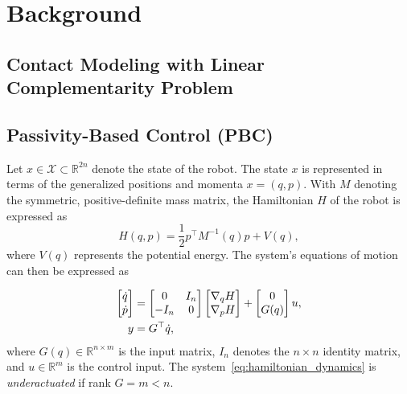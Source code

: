 \chapter{Background}
\label{ch:background}

\section{Contact Modeling with Linear Complementarity Problem}

\section{Passivity-Based Control (PBC)}

Let $x \in \mathcal{X} \subset \mathbb{R}^{2n}$ denote the state of the robot.
%
The state $x$ is represented in terms of the generalized positions and momenta
$x = (q, p)$. 
%
With $M$ denoting the symmetric, positive-definite mass matrix, the Hamiltonian
$H$ of the robot is expressed as 
%
\begin{equation}
    H(q,p) = \frac{1}{2} p^\top M^{-1}(q) p + V(q),
    \label{eq:system_hamiltonian}
\end{equation}
%
where $V(q)$ represents the potential energy. The system's equations of motion
can then be expressed as 

%
\begin{align}
    \begin{split}  
      \begin{bmatrix}\dot{q} \\ \dot{p}\end{bmatrix} &= \begin{bmatrix}0 & I_n \\ -I_n & 0\end{bmatrix}\begin{bmatrix}\nabla_qH \\
      \nabla_pH\end{bmatrix} + \begin{bmatrix}0 \\ G(q)\end{bmatrix}u, \\
      y &= G^\top \dot{q},
    \end{split}
    \label{eq:hamiltonian_dynamics}
\end{align}
%
where $G(q) \in \mathbb{R}^{n \times m}$ is the input matrix, $I_n$ denotes the
$n \times n$ identity matrix, and $u \in \mathbb{R}^m$ is
the control input.
%
The system~\eqref{eq:hamiltonian_dynamics} is \textit{underactuated} if rank $G
= m < n$.

